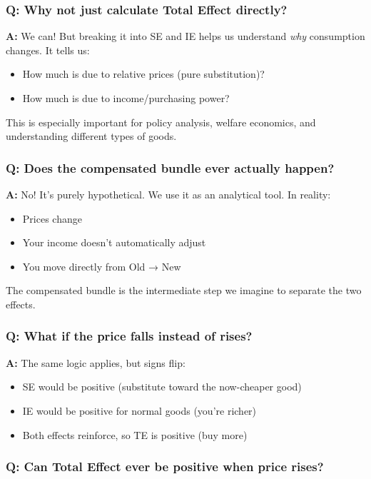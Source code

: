 \documentclass[11pt]{article}
\begin{document}
\subsubsection{Q: Why not just calculate Total Effect directly?}

\textbf{A:} We can! But breaking it into SE and IE helps us understand \textit{why} consumption changes. It tells us:
\begin{itemize}
    \item How much is due to relative prices (pure substitution)?
    \item How much is due to income/purchasing power?
\end{itemize}

This is especially important for policy analysis, welfare economics, and understanding different types of goods.

\subsubsection{Q: Does the compensated bundle ever actually happen?}

\textbf{A:} No! It's purely hypothetical. We use it as an analytical tool. In reality:
\begin{itemize}
    \item Prices change
    \item Your income doesn't automatically adjust
    \item You move directly from Old → New
\end{itemize}

The compensated bundle is the intermediate step we imagine to separate the two effects.

\subsubsection{Q: What if the price falls instead of rises?}

\textbf{A:} The same logic applies, but signs flip:
\begin{itemize}
    \item SE would be positive (substitute toward the now-cheaper good)
    \item IE would be positive for normal goods (you're richer)
    \item Both effects reinforce, so TE is positive (buy more)
\end{itemize}

\subsubsection{Q: Can Total Effect ever be positive when price rises?}
\end{document}
